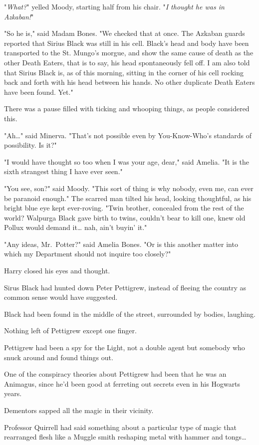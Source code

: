 "\emph{What?}" yelled Moody, starting half from his chair. "\emph{I thought he
was in Azkaban!}"

"So he is," said Madam Bones. "We checked that at once. The Azkaban guards
reported that Sirius Black was still in his cell. Black's head and body have
been transported to the St. Mungo's morgue, and show the same cause of death as
the other Death Eaters, that is to say, his head spontaneously fell off. I am
also told that Sirius Black is, as of this morning, sitting in the corner of
his cell rocking back and forth with his head between his hands. No other
duplicate Death Eaters have been found. Yet."

There was a pause filled with ticking and whooping things, as people considered
this.

"Ah{\ldots}" said Minerva. "That's not possible even by You-Know-Who's
standards of possibility. Is it?"

"I would have thought so too when I was your age, dear," said Amelia. "It is
the sixth strangest thing I have ever seen."

"You see, son?" said Moody. "This sort of thing is why nobody, even me, can
ever be paranoid enough." The scarred man tilted his head, looking thoughtful,
as his bright blue eye kept ever-roving. "Twin brother, concealed from the rest
of the world? Walpurga Black gave birth to twins, couldn't bear to kill one,
knew old Pollux would demand it{\ldots} nah, ain't buyin' it."

"Any ideas, Mr.~Potter?" said Amelia Bones. "Or is this another matter into
which my Department should not inquire too closely?"

Harry closed his eyes and thought.

Sirus Black had hunted down Peter Pettigrew, instead of fleeing the country as
common sense would have suggested.

Black had been found in the middle of the street, surrounded by bodies,
laughing.

Nothing left of Pettigrew except one finger.

Pettigrew had been a spy for the Light, not a double agent but somebody who
snuck around and found things out.

One of the conspiracy theories about Pettigrew had been that he was an
Animagus, since he'd been good at ferreting out secrets even in his Hogwarts
years.

Dementors sapped all the magic in their vicinity.

Professor Quirrell had said something about a particular type of magic that
rearranged flesh like a Muggle smith reshaping metal with hammer and
tongs{\ldots}

